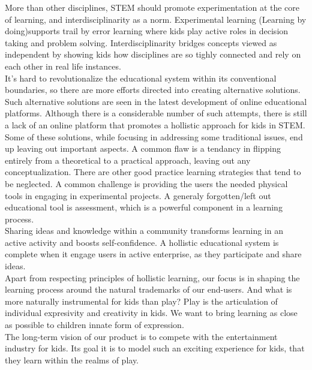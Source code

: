 More than other disciplines, STEM should promote experimentation at the core of learning, and interdisciplinarity as a norm. Experimental learning (Learning by doing)supports trail by error learning where kids play active roles in decision taking and problem solving. Interdisciplinarity bridges concepts viewed as independent by showing kids how disciplines are so tighly connected and rely on each other in real life instances. \\

It's hard to revolutionalize the educational system within its conventional boundaries, so there are more efforts directed into creating alternative solutions. Such alternative solutions are seen in the latest development of online educational platforms. Although there is a considerable number of such attempts, there is still a lack of an online platform that promotes a hollistic approach for kids in STEM.\\

Some of these solutions, while focusing in addressing some traditional issues, end up leaving out important aspects. A common flaw is a tendancy in flipping entirely from a theoretical to a practical approach, leaving out any conceptualization. 
There are other good practice learning strategies that tend to be neglected.
A common challenge is providing the users the needed physical tools in engaging in experimental projects. A generaly forgotten/left out educational tool is assessment, which is a powerful component in a learning process.\\

Sharing ideas and knowledge within a community transforms learning in an active activity and boosts self-confidence. A hollistic educational system is complete when it engage users in active enterprise, as they participate and share ideas.\\

Apart from respecting principles of hollistic learning, our focus is in shaping the learning process around the natural trademarks of our end-users. And what is more naturally instrumental for kids than play? Play is the articulation of individual expresivity and creativity in kids. We want to bring learning as close as possible to children innate form of expression.\\ 

The long-term vision of our product is to compete with the entertainment industry for kids. Its goal it is to model such an exciting experience for kids, that they learn within the realms of play.\\


